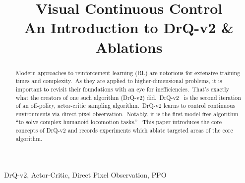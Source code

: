 \documentclass[conference]{./IEEEtran/IEEEtran} %
\begin{document}
    \title{Visual Continuous Control \\ {\large An Introduction to DrQ-v2 \& Ablations}}

    \author{
        \and
        \and
    }

    \maketitle

    \begin{abstract}
        Modern approaches to reinforcement learning (RL) are notorious for extensive training times and complexity.\ As
        they are applied to higher-dimensional problems, it is important to revisit their foundations with an eye for
        inefficiencies.\ That's exactly what the creators of one such algorithm (DrQ-v2) did.\ DrQ-v2~\cite{DrQv2} is
        the second iteration of an off-policy, actor-critic sampling algorithm.\ DrQ-v2 learns to control continuous
        environments via direct pixel observation.\ Notably, it is the first model-free algorithm \enquote{to solve
        complex humanoid locomotion tasks.}~\cite{DrQv2} This paper introduces the core concepts of DrQ-v2 and records
        experiments which ablate targeted areas of the core algorithm.
    \end{abstract}

    \begin{IEEEkeywords}
        DrQ-v2, Actor-Critic, Direct Pixel Observation, PPO
    \end{IEEEkeywords}
\end{document}
